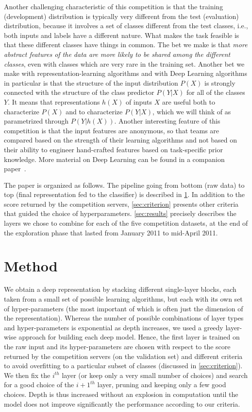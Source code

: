 Another challenging characteristic of this competition is that the training (development) distribution
is typically very different from the test (evaluation) distribution, because it involves
a set of classes different from the test classes, i.e., both inputs and labels
have a different nature. What makes the task feasible is that these different
classes have things in common. The bet we make %
is that {\em more abstract features of the data are more likely to be shared
among the different classes}, even with classes which are very rare in the
training set. Another bet we make with representation-learning algorithms
and with Deep Learning algorithms in particular is that
the structure of the input distribution $P(X)$
is strongly connected with the structure of the class predictor $P(Y|X)$
for all of the classes $Y$. It means that representations $h(X)$
of inputs $X$ are useful both to characterize $P(X)$ and to characterize
$P(Y|X)$, which we will think of as parametrized through $P(Y|h(X))$.
Another interesting feature of this competition is that the
input features are anonymous, so that teams are compared based on the strength
of their learning algorithms and not based on their ability to engineer
hand-crafted features based on task-specific prior knowledge.
More material on Deep Learning can be found in a companion paper~\citep{Bengio-DL-2011}.

The paper is organized as follows. The pipeline going from bottom (raw data)
to top (final representation fed to the classifier) is described in
\ref{sec:method}.  In addition to the score returned by the competition
servers, \ref{sec:criterion} presents other criteria that guided the
choice of hyperparameters. \ref{sec:results} precisely describes the
layers we chose to combine for each of the five competition datasets, at the end
of the exploration phase that lasted from January 2011 to mid-April 2011.

\section{Method}\label{sec:method}

We obtain a deep representation by
stacking different single-layer blocks, each taken from a small set of possible
learning algorithms, but each with its own set of hyper-parameters (the most
important of which is often just the dimension of the representation).
Whereas the number of possible combinations
of layer types  and hyper-parameters
is exponential as depth increases, we used a greedy layer-wise
approach \citep{Bengio-nips-2006} for building each deep model. Hence, the first
layer is trained on the raw input and its hyper-parameters are chosen with respect to
the score returned by the competition servers (on the validation set) and different criteria
to avoid overfitting to a particular subset of classes 
(discussed in \ref{sec:criterion}). We then fix the 
$i^{th}$ layer (or keep only a very small number of choices)
and search for a good choice of the $i+1^{th}$ layer, pruning
and keeping only a few good choices.
Depth is thus increased without an explosion in computation
until the model does not improve significantly the performance
according to our criteria.

